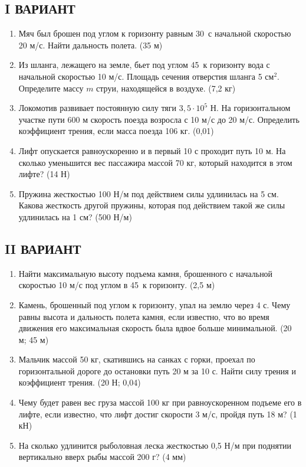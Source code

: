 \documentclass[a6paper, 11pt]{diss_4}
\renewcommand{\'}{\,'}
\begin{document}
\subsection{I ВАРИАНТ}
\begin{enumerate}

\item Мяч был брошен под углом к горизонту равным 30\textdegree\ с начальной скоростью 20 м/с. Найти дальность полета.
(35 м)
\item Из шланга, лежащего на земле, бьет под углом 45\textdegree\ к горизонту вода с начальной скоростью 10 м/с. Площадь сечения отверстия шланга 5 $см^2$. Определите массу $m$ струи, находящейся в воздухе.
(7,2 кг)
\item Локомотив развивает постоянную силу тяги $3,5\cdot10^5$ Н. На горизонтальном участке пути 600 м скорость поезда возросла с 10 м/с до 20 м/с. Определить коэффициент трения, если масса поезда 106 кг.
(0,01)
\item Лифт опускается равноускоренно и в первый 10 с проходит путь 10 м. На сколько уменьшится вес пассажира массой 70 кг, который находится в этом лифте?
(14 Н)
\item Пружина жесткостью 100 Н/м под действием силы удлинилась на 5 см. Какова жесткость другой пружины, которая под действием такой же силы удлинилась на 1 см?
(500 Н/м)

\end{enumerate}



\subsection{II ВАРИАНТ}
\begin{enumerate}

\item Найти максимальную высоту подъема камня, брошенного с начальной скоростью 10 м/с под углом в 45\textdegree\ к горизонту.
(2,5 м)
\item Камень, брошенный под углом к горизонту, упал на землю через 4 с. Чему равны высота и дальность полета камня, если известно, что во время движения его максимальная скорость была вдвое больше минимальной.
(20 м;    45 м)
\item Мальчик массой 50 кг, скатившись на санках с горки, проехал по горизонтальной дороге до остановки путь 20 м за 10 с. Найти силу трения и коэффициент трения.
(20 Н;    0,04)
\item Чему будет равен вес груза массой 100 кг при равноускоренном подъеме его в лифте, если известно, что лифт достиг скорости 3 м/с, пройдя путь 18 м?
(1 кН)
\item На сколько удлинится рыболовная леска жесткостью 0,5 Н/м при поднятии вертикально вверх рыбы массой 200 г?
(4 мм)

\end{enumerate}
\end{document}
